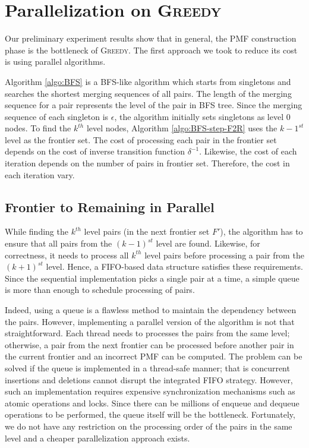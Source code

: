 \documentclass[12pt]{article}
\newcommand{\greedyAlgo}{\textsc{Greedy}}
\begin{document}
\clearpage
\section{Parallelization on \greedyAlgo}
\label{sec:parallel}

Our preliminary experiment results show that in general, the PMF construction phase is the bottleneck of \greedyAlgo. The first approach we took to reduce its cost is using parallel algorithms. 

Algorithm \ref{algo:BFS} is a BFS-like algorithm which starts from singletons and searches the shortest merging sequences of all pairs. The length of the merging sequence for a pair represents the level of the pair in BFS tree. Since the merging sequence of each singleton is $\epsilon$, the algorithm initially sets singletons as level 0 nodes. To find the $k^{th}$ level nodes, Algorithm \ref{algo:BFS-step-F2R} uses the $k-1^{st}$ level as the frontier set. The cost of processing each pair in the frontier set depends on the cost of inverse transition function $\delta^{-1}$. Likewise, the cost of each iteration depends on the number of pairs in frontier set. Therefore, the cost in each iteration vary.

\subsection{Frontier to Remaining in Parallel}
\label{sec:BFS-F2R-parallel}

While finding the $k^{th}$ level pairs (in the next frontier set $F'$), the algorithm has to ensure that all pairs from the $(k-1)^{st}$ level are found. Likewise, for correctness, it needs to process all $k^{th}$ level pairs before processing a pair from the $(k+1)^{st}$ level. Hence, a FIFO-based data structure satisfies these requirements. Since the sequential implementation picks a single pair at a time, a simple queue is more than enough to schedule processing of pairs. 

Indeed, using a queue is a flawless method to maintain the dependency between the pairs. However, implementing a parallel version of the algorithm is not that straightforward. Each thread needs to processes the pairs from the same level; otherwise, a pair from the next frontier can be processed before another pair in the current frontier and an incorrect PMF can be computed. The problem can be solved if the queue is implemented in a thread-safe manner; that is concurrent insertions and deletions cannot disrupt the integrated FIFO strategy. However, such an implementation requires expensive synchronization mechanisms such as atomic operations and locks. Since there can be millions of enqueue and dequeue operations to be performed, the queue itself will be the bottleneck. Fortunately, we do not have any restriction on the processing order of the pairs in the same level and a cheaper parallelization approach exists.  
\end{document}
